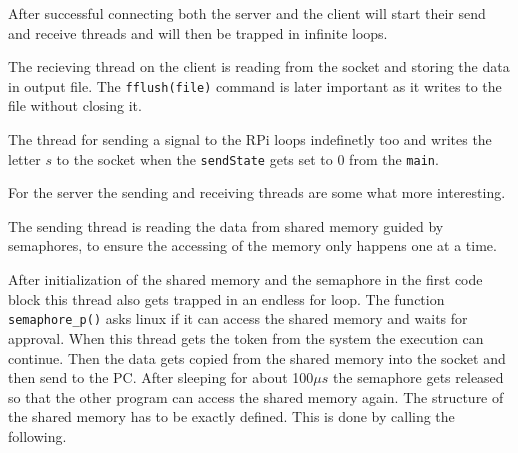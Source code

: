 \documentclass[12pt,paper=a4,twoside]{scrartcl}
\numberwithin{equation}{section}
\begin{document}
After successful connecting both the server and the client will start their send and receive threads and will then be trapped in infinite loops.





The recieving thread on the client is reading from the socket and storing the data in output file. The \verb+fflush(file)+ command is later important as it writes to the file without closing it.

The thread for sending a signal to the RPi loops indefinetly too and writes the letter $s$ to the socket when the \verb+sendState+ gets set to 0 from the \verb+main+.


For the server the sending and receiving threads are some what more interesting.

The sending thread is reading the data from shared memory guided by semaphores, to ensure the accessing of the memory only happens one at a time.



After initialization of the shared memory and the semaphore in the first code block this thread also gets trapped in an endless for loop. The function \verb+semaphore_p()+ asks linux if it can access the shared memory and waits for approval. When this thread gets the token from the system the execution can continue. Then the data gets copied from the shared memory into the socket and then send to the PC. After sleeping for about 100$\mu s$ the semaphore gets released so that the other program can access the shared memory again.
The structure of the shared memory has to be exactly defined. This is done by calling the following.

\end{document}
